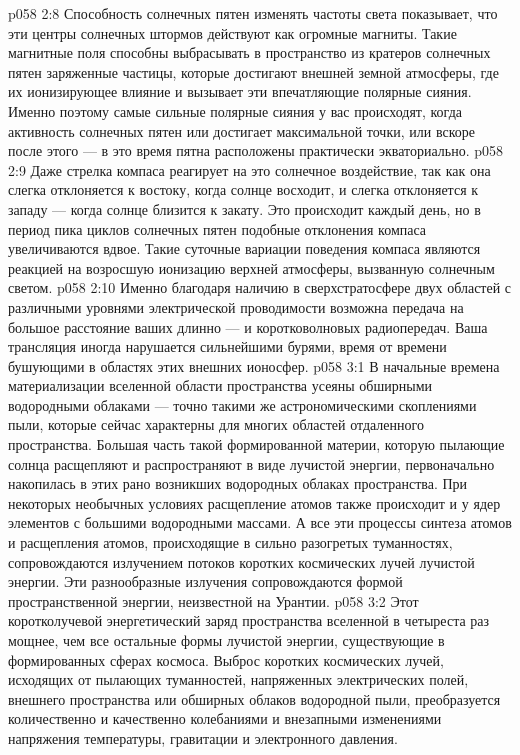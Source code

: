 \vs p058 2:8 Способность солнечных пятен изменять частоты света показывает, что эти центры солнечных штормов действуют как огромные магниты. Такие магнитные поля способны выбрасывать в пространство из кратеров солнечных пятен заряженные частицы, которые достигают внешней земной атмосферы, где их ионизирующее влияние и вызывает эти впечатляющие полярные сияния. Именно поэтому самые сильные полярные сияния у вас происходят, когда активность солнечных пятен или достигает максимальной точки, или вскоре после этого --- в это время пятна расположены практически экваториально.
\vs p058 2:9 Даже стрелка компаса реагирует на это солнечное воздействие, так как она слегка отклоняется к востоку, когда солнце восходит, и слегка отклоняется к западу --- когда солнце близится к закату. Это происходит каждый день, но в период пика циклов солнечных пятен подобные отклонения компаса увеличиваются вдвое. Такие суточные вариации поведения компаса являются реакцией на возросшую ионизацию верхней атмосферы, вызванную солнечным светом.
\vs p058 2:10 Именно благодаря наличию в сверхстратосфере двух областей с различными уровнями электрической проводимости возможна передача на большое расстояние ваших длинно --- и коротковолновых радиопередач. Ваша трансляция иногда нарушается сильнейшими бурями, время от времени бушующими в областях этих внешних ионосфер.
\vs p058 3:1 В начальные времена материализации вселенной области пространства усеяны обширными водородными облаками --- точно такими же астрономическими скоплениями пыли, которые сейчас характерны для многих областей отдаленного пространства. Большая часть такой формированной материи, которую пылающие солнца расщепляют и распространяют в виде лучистой энергии, первоначально накопилась в этих рано возникших водородных облаках пространства. При некоторых необычных условиях расщепление атомов также происходит и у ядер элементов с большими водородными массами. А все эти процессы синтеза атомов и расщепления атомов, происходящие в сильно разогретых туманностях, сопровождаются излучением потоков коротких космических лучей лучистой энергии. Эти разнообразные излучения сопровождаются формой пространственной энергии, неизвестной на Урантии.
\vs p058 3:2 Этот коротколучевой энергетический заряд пространства вселенной в четыреста раз мощнее, чем все остальные формы лучистой энергии, существующие в формированных сферах космоса. Выброс коротких космических лучей, исходящих от пылающих туманностей, напряженных электрических полей, внешнего пространства или обширных облаков водородной пыли, преобразуется количественно и качественно колебаниями и внезапными изменениями напряжения температуры, гравитации и электронного давления.
